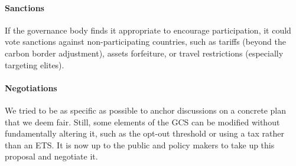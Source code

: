 \documentclass[12pt,english]{article}
\begin{document}





\paragraph{Sanctions}

If the governance body finds it appropriate to encourage participation, it could vote sanctions against non-participating countries, such as tariffs (beyond the carbon border adjustment), assets forfeiture, or travel restrictions (especially targeting elites). 

\paragraph{Negotiations}

We tried to be as specific as possible to anchor discussions on a concrete plan that we deem fair. Still, some elements of the GCS can be modified without fundamentally altering it, such as the opt-out threshold or using a tax rather than an ETS. It is now up to the public and policy makers to take up this proposal and negotiate it. 

\renewcommand{\url}[1]{\href{#1}{Link}} %
{\small 

}
\end{document}

